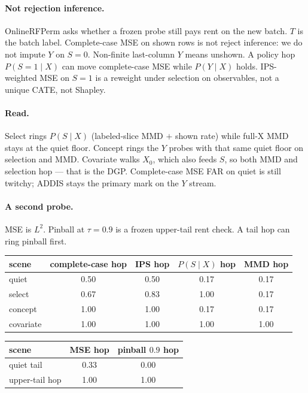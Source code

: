 \documentclass[11pt]{article}
\begin{document}
\paragraph{Not rejection inference.}
OnlineRFPerm asks whether a frozen probe still pays rent on the new batch.
$T$ is the batch label. Complete-case MSE on shown rows is not reject inference:
we do not impute $Y$ on $S=0$. Non-finite last-column $Y$ means unshown.
A policy hop $P(S=1\mid X)$ can move complete-case MSE while $P(Y\mid X)$ holds.
IPS-weighted MSE on $S=1$ is a reweight under selection on observables,
not a unique CATE, not Shapley.
\paragraph{Read.}
Select rings $P(S\mid X)$ (labeled-slice MMD $+$ shown rate) while full-X MMD stays at the quiet floor.
Concept rings the $Y$ probes with that same quiet floor on selection and MMD.
Covariate walks $X_0$, which also feeds $S$, so both MMD and selection hop --- that is the DGP.
Complete-case MSE FAR on quiet is still twitchy; ADDIS stays the primary mark on the $Y$ stream.
\paragraph{A second probe.}
MSE is $L^2$. Pinball at $\tau=0.9$ is a frozen upper-tail rent check.
A tail hop can ring pinball first.
\vspace{0.8em}
\begin{tabular}{@{}lcccc@{}}
\toprule
scene & complete-case hop & IPS hop & $P(S\mid X)$ hop & MMD hop \\
\midrule
quiet & 0.50 & 0.50 & 0.17 & 0.17 \\
select & 0.67 & 0.83 & 1.00 & 0.17 \\
concept & 1.00 & 1.00 & 0.17 & 0.17 \\
covariate & 1.00 & 1.00 & 1.00 & 1.00 \\
\bottomrule
\end{tabular}
\vspace{1.1em}
\begin{tabular}{@{}lcc@{}}
\toprule
scene & MSE hop & pinball $0.9$ hop \\
\midrule
quiet tail & 0.33 & 0.00 \\
upper-tail hop & 1.00 & 1.00 \\
\bottomrule
\end{tabular}
\end{document}
